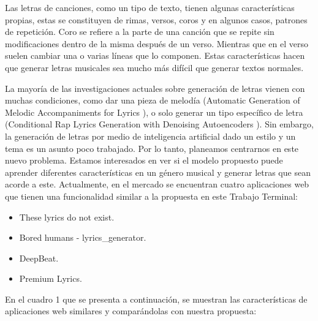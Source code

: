 \documentclass[12pt, a4paper, titlepage]{report}
\begin{document}
    Las letras de canciones, como un tipo de texto, tienen algunas características propias, estas se constituyen de rimas, versos, coros y en algunos casos, patrones de repetición. Coro se refiere a la parte de una canción que se repite sin modificaciones dentro de la misma después de un verso. Mientras que en el verso suelen cambiar una o varias líneas que lo componen. Estas características hacen que generar letras musicales sea mucho más difícil que generar textos normales.\par
    
    La mayoría de las investigaciones actuales sobre generación de letras vienen con muchas condiciones, como dar una pieza de melodía (Automatic Generation of Melodic Accompaniments for Lyrics \cite{Automatic_Generation_of_Melodic_Accompaniments_for_Lyrics}), o solo generar un tipo específico de letra (Conditional Rap Lyrics Generation with Denoising Autoencoders \cite{Conditional_Rap_Lyrics_Generation}). Sin embargo, la generación de letras por medio de inteligencia artificial dado un estilo y un tema es un asunto poco trabajado. Por lo tanto, planeamos centrarnos en este nuevo problema. Estamos interesados en ver si el modelo propuesto puede aprender diferentes características en un género musical y generar letras que sean acorde a este. Actualmente, en el mercado se encuentran cuatro aplicaciones web que tienen una funcionalidad similar a la propuesta en este Trabajo Terminal:\par
    
    \begin{itemize}
    	\item These lyrics do not exist.
    	\item Bored humans - lyrics\_generator.
    	\item DeepBeat.
    	\item Premium Lyrics.
    \end{itemize}
\newpage
	En el cuadro 1 que se presenta a continuación, se muestran las características de aplicaciones web similares y comparándolas con nuestra propuesta:
\end{document}
